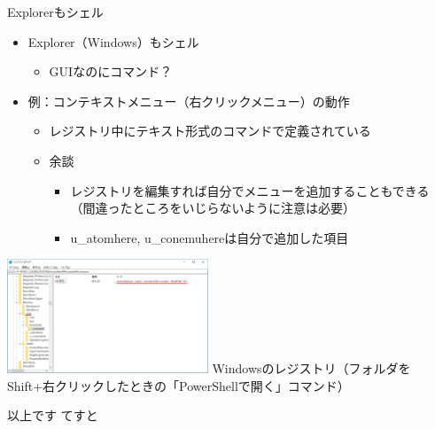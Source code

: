 \documentclass[12pt,aspectratio=169]{beamer}
\begin{document}
\begin{frame}{Explorerもシェル}

  \begin{minipage}{0.45\textwidth}
    \begin{itemize}
      \item Explorer（Windows）もシェル
        \begin{itemize}
          \item GUIなのにコマンド？
        \end{itemize}
      \item 例：コンテキストメニュー（右クリックメニュー）の動作
        \begin{itemize}
          \item レジストリ中にテキスト形式のコマンドで定義されている
          \item { \tiny 余談 }
            \begin{itemize}
              \item { \tiny レジストリを編集すれば自分でメニューを追加することもできる（間違ったところをいじらないように注意は必要） }
              \item { \tiny u\_atomhere, u\_conemuhereは自分で追加した項目 }
            \end{itemize}
        \end{itemize}
    \end{itemize}

  \end{minipage}
  \hfill
  \begin{minipage}{0.45\textwidth}
    \includegraphics[width=6cm,bb=0 0 659 481]{./images/regedit.png}
    { \tiny Windowsのレジストリ（フォルダをShift+右クリックしたときの「PowerShellで開く」コマンド） }
  \end{minipage}

\end{frame}


\begin{frame}{以上です}
てすと

\end{frame}
\end{document}

